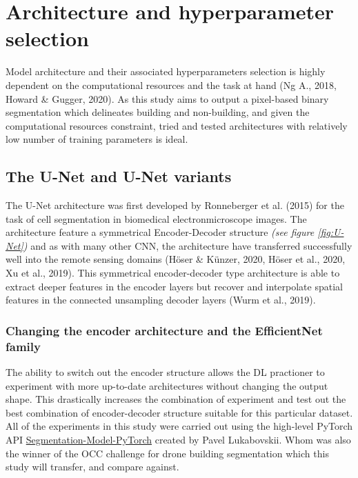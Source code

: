 \documentclass[11pt, a4paper, twoside]{report}
\begin{document}
\section{Architecture and hyperparameter selection}\label{Arch&Hyperparam}

Model architecture and their associated hyperparameters selection is highly dependent on the computational resources and the task at hand (Ng A., 2018, Howard \& Gugger, 2020). As this study aims to output a pixel-based binary segmentation which delineates building and non-building, and given the computational resources constraint, tried and tested architectures with relatively low number of training parameters is ideal.\\\par

\subsection{The U-Net and U-Net variants}\label{Unet}

The U-Net architecture was first developed by Ronneberger et al. (2015) for the task of cell segmentation in biomedical electronmicroscope images. The architecture feature a symmetrical Encoder-Decoder structure \textit{(see figure \ref{fig:U-Net})} and as with many other CNN, the architecture have transferred successfully well into the remote sensing domains (Höser \& Künzer, 2020, Höser et al., 2020, Xu et al., 2019). This symmetrical encoder-decoder type architecture is able to extract deeper features in the encoder layers but recover and interpolate spatial features in the connected unsampling decoder layers (Wurm et al., 2019).\\\par

\subsubsection{Changing the encoder architecture and the EfficientNet family}\label{EffNet}

The ability to switch out the encoder structure allows the DL practioner to experiment with more up-to-date architectures without changing the output shape. This drastically increases the combination of experiment and test out the best combination of encoder-decoder structure suitable for this particular dataset. All of the experiments in this study were carried out using the high-level PyTorch API \href{https://segmentation-models-pytorch.readthedocs.io/en/latest/quickstart.html}{Segmentation-Model-PyTorch} created by Pavel Lukabovskii. Whom was also the winner of the OCC challenge for drone building segmentation which this study will transfer, and compare against.\\\par
\end{document}
